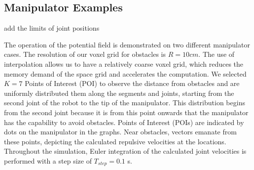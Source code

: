 \documentclass[letterpaper, 10 pt, conference]{ieeeconf}  %
\begin{document}
\subsection{Manipulator Examples}

\alert{add the limits of joint positions}



The operation of the potential field is demonstrated on two different manipulator cases. The resolution of our voxel grid for obstacles is \( R=10cm \). The use of interpolation allows us to have a relatively coarse voxel grid, which reduces the memory demand of the space grid and accelerates the computation. We selected \( K = 7 \) Points of Interest (POI) to observe the distance from obstacles and are uniformly distributed them along the segments and joints, starting from the second joint of the robot to the tip of the manipulator. This distribution begins from the second joint because it is from this point onwards that the manipulator has the capability to avoid obstacles. Points of Interest (POIs) are indicated by dots on the manipulator in the graphs. Near obstacles, vectors emanate from these points, depicting the calculated repulsive velocities at the locations. Throughout the simulation, Euler integration of the calculated joint velocities is performed with a step size of \( T_{step} = 0.1 \) s.

\end{document}
